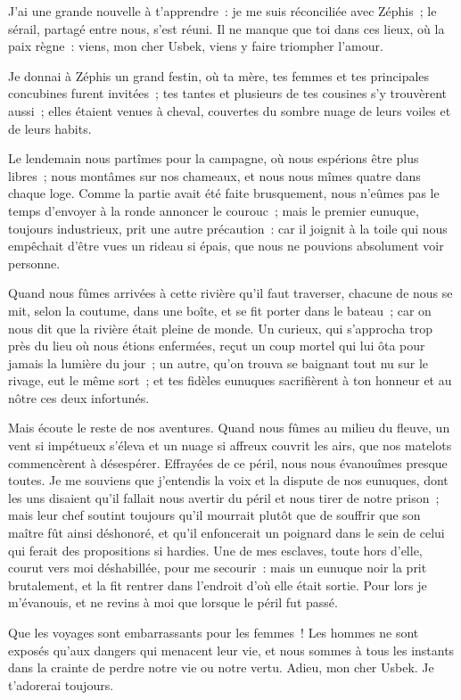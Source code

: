 \documentclass[french,twoside]{book} %
\begin{document}
\noindent J’ai une grande nouvelle à t’apprendre : je me suis réconciliée avec Zéphis ; le sérail, partagé entre nous, s’est réuni. Il ne manque que toi dans ces lieux, où la paix règne : viens, mon cher Usbek, viens y faire triompher l’amour.\par
Je donnai à Zéphis un grand festin, où ta mère, tes femmes et tes principales concubines furent invitées ; tes tantes et plusieurs de tes cousines s’y trouvèrent aussi ; elles étaient venues à cheval, couvertes du sombre nuage de leurs voiles et de leurs habits.\par
Le lendemain nous partîmes pour la campagne, où nous espérions être plus libres ; nous montâmes sur nos chameaux, et nous nous mîmes quatre dans chaque loge. Comme la partie avait été faite brusquement, nous n’eûmes pas le temps d’envoyer à la ronde annoncer le courouc ; mais le premier eunuque, toujours industrieux, prit une autre précaution : car il joignit à la toile qui nous empêchait d’être vues un rideau si épais, que nous ne pouvions absolument voir personne.\par
Quand nous fûmes arrivées à cette rivière qu’il faut traverser, chacune de nous se mit, selon la coutume, dans une boîte, et se fit porter dans le bateau ; car on nous dit que la rivière était pleine de monde. Un curieux, qui s’approcha trop près du lieu où nous étions enfermées, reçut un coup mortel qui lui ôta pour jamais la lumière du jour ; un autre, qu’on trouva se baignant tout nu sur le rivage, eut le même sort ; et tes fidèles eunuques sacrifièrent à ton honneur et au nôtre ces deux infortunés.\par
Mais écoute le reste de nos aventures. Quand nous fûmes au milieu du fleuve, un vent si impétueux s’éleva et un nuage si affreux couvrit les airs, que nos matelots commencèrent à désespérer. Effrayées de ce péril, nous nous évanouîmes presque toutes. Je me souviens que j’entendis la voix et la dispute de nos eunuques, dont les uns disaient qu’il fallait nous avertir du péril et nous tirer de notre prison ; mais leur chef soutint toujours qu’il mourrait plutôt que de souffrir que son maître fût ainsi déshonoré, et qu’il enfoncerait un poignard dans le sein de celui qui ferait des propositions si hardies. Une de mes esclaves, toute hors d’elle, courut vers moi déshabillée, pour me secourir : mais un eunuque noir la prit brutalement, et la fit rentrer dans l’endroit d’où elle était sortie. Pour lors je m’évanouis, et ne revins à moi que lorsque le péril fut passé.\par
Que les voyages sont embarrassants pour les femmes ! Les hommes ne sont exposés qu’aux dangers qui menacent leur vie, et nous sommes à tous les instants dans la crainte de perdre notre vie ou notre vertu. Adieu, mon cher Usbek. Je t’adorerai toujours.\par
\end{document}
